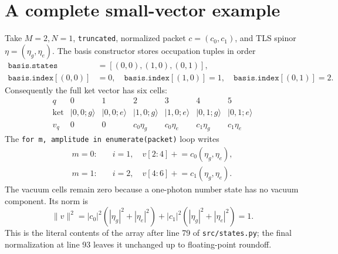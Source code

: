 \documentclass[11pt,a4paper]{article}
\newcommand{\ket}[1]{\lvert #1\rangle}
\newcommand{\code}[1]{\nolinkurl{#1}}
\begin{document}
\section{A complete small-vector example}
Take $M=2,N=1$, \code{truncated}, normalized packet
$c=(c_0,c_1)$, and TLS spinor $\eta=(\eta_g,\eta_e)$.
The basis constructor stores occupation tuples in order
\begin{align*}
\texttt{basis.states}&=[(0,0),(1,0),(0,1)],\\
\texttt{basis.index}[(0,0)]&=0,\quad
\texttt{basis.index}[(1,0)]=1,\quad
\texttt{basis.index}[(0,1)]=2.
\end{align*}
Consequently the full ket vector has six cells:
\[
\begin{array}{c|cccccc}
q&0&1&2&3&4&5\\
\hline
\text{ket}&\ket{0,0;g}&\ket{0,0;e}&\ket{1,0;g}&
\ket{1,0;e}&\ket{0,1;g}&\ket{0,1;e}\\
v_q&0&0&c_0\eta_g&c_0\eta_e&c_1\eta_g&c_1\eta_e
\end{array}
\]
The \code{for m, amplitude in enumerate(packet)} loop writes
\[
\begin{aligned}
m=0:\quad &i=1,\quad
  v[2:4]\mathrel{+}=c_0(\eta_g,\eta_e),\\
m=1:\quad &i=2,\quad
  v[4:6]\mathrel{+}=c_1(\eta_g,\eta_e).
\end{aligned}
\]
The vacuum cells remain zero because a one-photon number state has no vacuum
component. Its norm is
\[
\|v\|^2
=|c_0|^2(|\eta_g|^2+|\eta_e|^2)
 +|c_1|^2(|\eta_g|^2+|\eta_e|^2)
=1.
\]
This is the literal contents of the array after line 79 of \code{src/states.py};
the final normalization at line 93 leaves it unchanged up to floating-point
roundoff.
\end{document}

